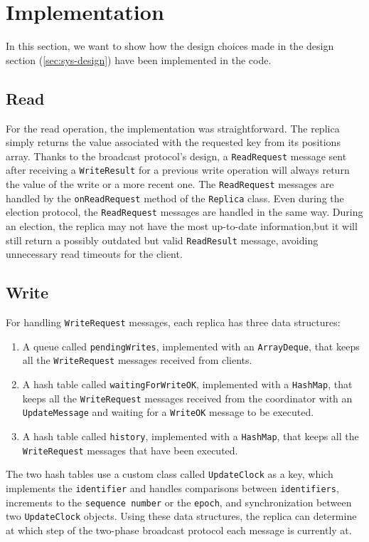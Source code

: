 \section{Implementation}
In this section, we want to show how the design choices made in the design section (\ref{sec:sys-design}) have been implemented in the code. 

\subsection{Read}
For the read operation, the implementation was straightforward. The replica simply returns the value associated with the requested key from its positions array.
Thanks to the broadcast protocol's design, a \texttt{ReadRequest} message sent after receiving a \texttt{WriteResult} for a previous
write operation will always return the value of the write or a more recent one.
The \texttt{ReadRequest} messages are handled by the \texttt{onReadRequest} method of the \texttt{Replica} class.
Even during the election protocol, the \texttt{ReadRequest} messages are handled in the same way.
During an election, the replica may not have the most up-to-date information,but it will still return a possibly outdated but valid
\texttt{ReadResult} message, avoiding unnecessary read timeouts for the client.

\subsection{Write}
For handling \texttt{WriteRequest} messages, each replica has three data structures:
\begin{enumerate}
    \item A queue called \texttt{pendingWrites}, implemented with an \texttt{ArrayDeque}, that keeps all the \texttt{WriteRequest} messages received from clients.
    \item A hash table called \texttt{waitingForWriteOK}, implemented with a \texttt{HashMap}, that keeps all the \texttt{WriteRequest} messages received from the coordinator with an \texttt{UpdateMessage} and waiting for a \texttt{WriteOK} message to be executed.
    \item A hash table called \texttt{history}, implemented with a \texttt{HashMap}, that keeps all the \texttt{WriteRequest} messages that have been executed.
\end{enumerate}
The two hash tables use a custom class called \texttt{UpdateClock} as a key, which implements the \texttt{identifier} and handles comparisons between \texttt{identifiers}, increments to the \texttt{sequence number} or the \texttt{epoch}, and synchronization between two \texttt{UpdateClock} objects.
Using these data structures, the replica can determine at which step of the two-phase broadcast protocol each message is currently at.

